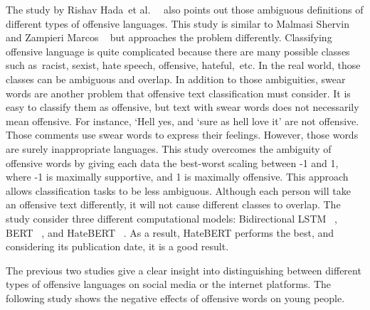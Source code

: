 \documentclass[12pt, natbib=false]{article}
\begin{document}
The study by Rishav Hada et al. ~\cite{hada2021ruddit} also points out those ambiguous definitions of different types of offensive languages.
This study is similar to Malmasi Shervin and Zampieri Marcos ~\cite{malmasi2017detecting} but approaches the problem differently.
Classifying offensive language is quite complicated because there are many possible classes such as racist, sexist, hate speech, offensive, hateful, etc. In the real world, those classes can be ambiguous and overlap.
In addition to those ambiguities, swear words are another problem that offensive text classification must consider.
It is easy to classify them as offensive, but text with swear words does not necessarily mean offensive.
For instance, ‘Hell yes, and ‘sure as hell love it’ are not offensive.
Those comments use swear words to express their feelings.
However, those words are surely inappropriate languages.
This study overcomes the ambiguity of offensive words by giving each data the best-worst scaling between -1 and 1, where -1 is maximally supportive, and 1 is maximally offensive.
This approach allows classification tasks to be less ambiguous.
Although each person will take an offensive text differently, it will not cause different classes to overlap.
The study consider three different computational models: Bidirectional LSTM ~\cite{pennington2014glove}, BERT ~\cite{devlin2018bert}, and HateBERT ~\cite{caselli2020hatebert}.
As a result, HateBERT performs the best, and considering its publication date, it is a good result. 

The previous two studies give a clear insight into distinguishing between different types of offensive languages on social media or the internet platforms.
The following study shows the negative effects of offensive words on young people.
\end{document}
